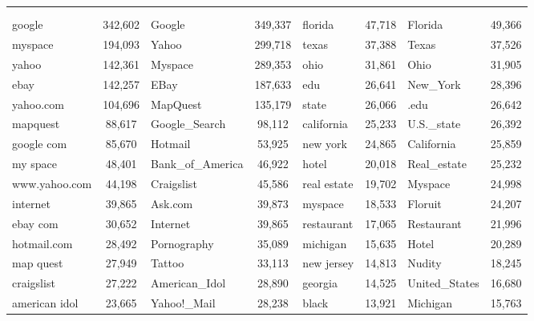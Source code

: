 \begin{figure*}
	\footnotesize
	\centering
\begin{tabular}{lc|lc|lc|lc}
\toprule
\multicolumn{4}{c}{\head{}} & \multicolumn{4}{c}{\tail{}}\\
\multicolumn{2}{c}{\shead{}} & \multicolumn{2}{c}{\ehead{}} & \multicolumn{2}{c}{\stail{}} & \multicolumn{2}{c}{\etail{}}\\
\midrule
google         & 342,602  &  Google  		   & 349,337  &  florida 	 &	47,718	&	Florida 		& 49,366 \\
myspace        & 194,093  &  Yahoo\!  		   & 299,718  &  texas  	 &	 37,388  &   Texas   		& 37,526 \\
yahoo          & 142,361  &  Myspace 		   & 289,353  &  ohio    	 &	31,861   &   Ohio    		& 31,905 \\			
ebay           & 142,257  &   EBay   		   & 187,633  &  edu     	 &	26,641   &   New\_York        & 28,396 \\
yahoo.com      & 104,696  &  MapQuest          & 135,179  &  state   	 &	26,066   &   .edu    		& 26,642 \\
mapquest       & 88,617   &  Google\_Search     & 98,112   &  california  &   25,233  &   U.S.\_state      & 26,392 \\
google com     & 85,670   &  Hotmail           & 53,925   &  new york    &   24,865  &   California      & 25,859 \\
my space       & 48,401   &	  Bank\_of\_America  & 46,922   &  hotel   	 &	20,018   &   Real\_estate     & 25,232 \\
www.yahoo.com  & 44,198   &  Craigslist        & 45,586   &  real estate &   19,702  &   Myspace 		& 24,998 \\
internet       & 39,865   &  Ask.com           & 39,873   &  myspace 	 &	18,533   &   Floruit 		& 24,207 \\
ebay com       & 30,652   &  Internet          & 39,865   &  restaurant  &  17,065   &   Restaurant      & 21,996 \\
hotmail.com    & 28,492   &  Pornography       & 35,089   &  michigan    &   15,635  &   Hotel   		& 20,289 \\
map quest      & 27,949   &  Tattoo            & 33,113   &  new jersey  &   14,813  &   Nudity  		& 18,245 \\
craigslist     & 27,222   &  American\_Idol     & 28,890   &  georgia 	 &	14,525   &   United\_States   & 16,680 \\
american idol  & 23,665   &  Yahoo!\_Mail       & 28,238   &  black   	 &	13,921   &   Michigan        & 15,763 \\
\bottomrule
\end{tabular}
\end{figure*}



